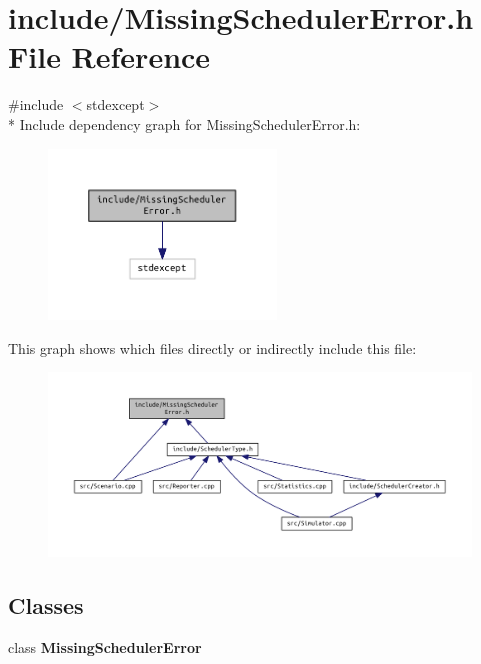 \section{include/\+Missing\+Scheduler\+Error.h File Reference}
\label{_missing_scheduler_error_8h}
{\ttfamily \#include $<$stdexcept$>$}\\*
Include dependency graph for Missing\+Scheduler\+Error.\+h\+:\nopagebreak
\begin{figure}[H]
\begin{center}
\leavevmode
\includegraphics[width=172pt]{_missing_scheduler_error_8h__incl}
\end{center}
\end{figure}
This graph shows which files directly or indirectly include this file\+:\nopagebreak
\begin{figure}[H]
\begin{center}
\leavevmode
\includegraphics[width=350pt]{_missing_scheduler_error_8h__dep__incl}
\end{center}
\end{figure}
\subsection*{Classes}
\begin{DoxyCompactItemize}
\item 
class {\bf Missing\+Scheduler\+Error}
\end{DoxyCompactItemize}
